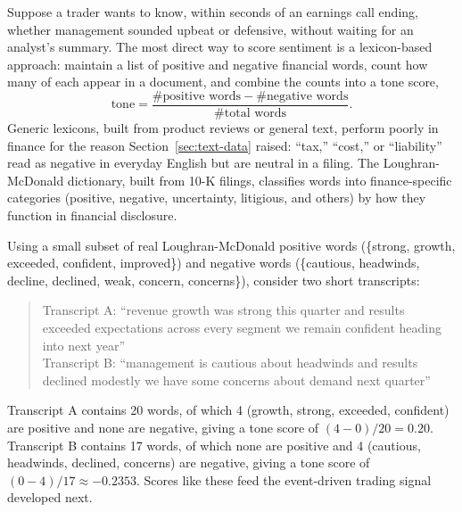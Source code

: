 \documentclass[../ai_in_finance]{subfiles}
\begin{document}
Suppose a trader wants to know, within seconds of an earnings call ending, whether management sounded upbeat or defensive, without waiting for an analyst's summary. The most direct way to score sentiment is a lexicon-based approach: maintain a list of positive and negative financial words, count how many of each appear in a document, and combine the counts into a tone score,
\begin{equation}
\text{tone} = \frac{\#\text{positive words} - \#\text{negative words}}{\#\text{total words}}.
\label{eq:nlp-tone}
\end{equation}
Generic lexicons, built from product reviews or general text, perform poorly in finance for the reason Section~\ref{sec:text-data} raised: ``tax,'' ``cost,'' or ``liability'' read as negative in everyday English but are neutral in a filing. The Loughran-McDonald dictionary, built from 10-K filings, classifies words into finance-specific categories (positive, negative, uncertainty, litigious, and others) by how they function in financial disclosure.


Using a small subset of real Loughran-McDonald positive words (\{strong, growth, exceeded, confident, improved\}) and negative words (\{cautious, headwinds, decline, declined, weak, concern, concerns\}), consider two short transcripts:

\begin{quote}
\small
Transcript A: ``revenue growth was strong this quarter and results exceeded expectations across every segment we remain confident heading into next year''\\
Transcript B: ``management is cautious about headwinds and results declined modestly we have some concerns about demand next quarter''
\end{quote}

Transcript A contains 20 words, of which 4 (growth, strong, exceeded, confident) are positive and none are negative, giving a tone score of $(4-0)/20 = 0.20$. Transcript B contains 17 words, of which none are positive and 4 (cautious, headwinds, declined, concerns) are negative, giving a tone score of $(0-4)/17 \approx -0.2353$. Scores like these feed the event-driven trading signal developed next.
\end{document}
